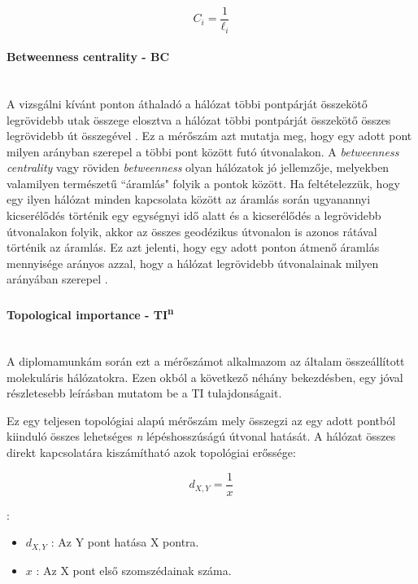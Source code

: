 \documentclass[a4paper,12pt]{article}
\begin{document}
	 	\begin{equation}
			C_i = \frac{1}{\ell_i}
	 	\end{equation}

	 \paragraph{Betweenness centrality - BC} \mbox{}\\
	 A vizsgálni kívánt ponton áthaladó a hálózat többi pontpárját összekötő legrövidebb utak összege elosztva a hálózat többi pontpárját összekötő összes legrövidebb út összegével \cite{top_indexes}. 	 Ez a mérőszám azt mutatja meg, hogy egy adott pont milyen arányban szerepel a többi pont között futó útvonalakon. A \textit{betweenness centrality} vagy röviden  \textit{betweenness} olyan hálózatok jó jellemzője, melyekben valamilyen természetű ``áramlás" folyik a pontok között. Ha feltételezzük, hogy egy ilyen hálózat minden kapcsolata között az áramlás során ugyanannyi kicserélődés történik egy egységnyi idő alatt és a kicserélődés a legrövidebb útvonalakon folyik, akkor az összes geodézikus útvonalon is azonos rátával történik az áramlás. Ez azt jelenti, hogy egy adott ponton átmenő áramlás mennyisége arányos azzal, hogy a hálózat legrövidebb útvonalainak milyen arányában szerepel \cite{newman_networks}.

	 \paragraph{Topological importance - TI\textsuperscript{n}}  \mbox{}\\
	 A diplomamunkám során ezt a mérőszámot alkalmazom az általam összeállított molekuláris hálózatokra. Ezen okból a következő néhány bekezdésben, egy jóval részletesebb leírásban mutatom be a TI tulajdonságait.

	 Ez egy teljesen topológiai alapú mérőszám mely összegzi az egy adott pontból kiinduló összes lehetséges \textit{n} lépéshosszúságú útvonal hatását. A hálózat összes direkt kapcsolatára kiszámítható azok topológiai erőssége:

	 \begin{equation}
		d_{X,Y} = \frac{1}{x}
	 \end{equation}

 	 :
 	 \begin{itemize}[label=]
		 \item $d_{X,Y}$ : Az Y pont hatása X pontra.
		 \item $x$ : Az X pont első szomszédainak száma.
 	 \end{itemize}
\end{document}
